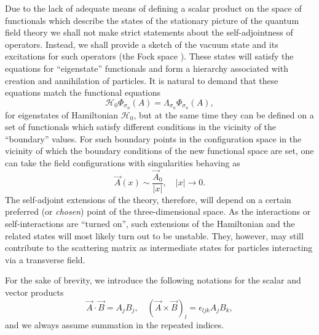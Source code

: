 \documentclass[12pt]{article}
\newcommand{\HH}{\mathscr{H}}
\begin{document}
	Due to the lack of adequate means of defining a scalar product on the space of functionals
	which describe the states of the stationary picture of the quantum field theory
	we shall not make strict statements about the self-adjointness of operators.
	Instead, we shall provide a sketch of the vacuum state and its excitations for such operators (the Fock space
\cite{Fock}).
	These states will satisfy the equations for ``eigenstate'' functionals and
	form a hierarchy associated with creation and annihilation of particles.
	It is natural to demand that these equations match
	the functional equations
\begin{equation*}
    \HH_{0} \Phi_{\sigma_{n}}(A) = \Lambda_{\sigma_{n}} \Phi_{\sigma_{n}}(A) ,
\end{equation*}
	for eigenstates of Hamiltonian
$ \HH_{0} $,
	but at the same time they can be defined on a set of functionals
	which satisfy different conditions in the vicinity of the ``boundary'' values.
	For such boundary points in the configuration space
	in the vicinity of which the boundary conditions of the new functional space are set,
	one can take the field configurations with singularities behaving as
\begin{equation}
\label{Asing}
    \vec{A}(x) \sim \frac{\vec{A}_{0}}{|x|}, \quad |x| \to 0.
\end{equation}
	The self-adjoint extensions of the theory, therefore, will depend on a
	certain preferred (or {\it chosen})  point of the three-dimensional space.
	As the interactions or self-interactions are ``turned on'',
	such extensions of the Hamiltonian and the related states will most likely
	turn out to be unstable.
	They, however, may still contribute to the scattering matrix as
	intermediate states for particles interacting via a transverse field.

	For the sake of brevity, we introduce the following notations for the
	scalar and vector products
\begin{equation*}
    \vec{A}\cdot\vec{B} = A_{j}B_{j} ,\quad
	(\vec{A}\times\vec{B})_{l} = \epsilon_{ljk} A_{j} B_{k} ,
\end{equation*}
	and we always assume summation in the repeated indices.




\end{document}
